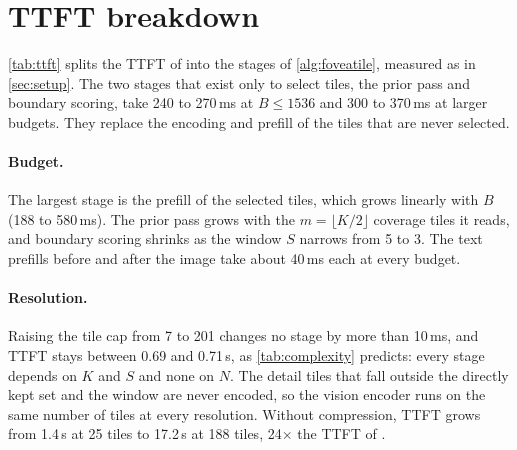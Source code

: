 \section{TTFT breakdown}
\label{sec:supp_ttft}



\cref{tab:ttft} splits the TTFT of \method into the stages of \cref{alg:foveatile}, measured as in
\cref{sec:setup}. The two stages that exist only to select tiles, the prior pass and boundary scoring, take
240 to 270\,ms at $B\le1536$ and 300 to 370\,ms at larger budgets. They replace the encoding and prefill
of the tiles that are never selected.

\paragraph{Budget.} The largest stage is the prefill of the selected tiles, which grows linearly with $B$
(188 to 580\,ms). The prior pass grows with the $m=\lfloor K/2\rfloor$ coverage tiles it reads, and boundary
scoring shrinks as the window $S$ narrows from 5 to 3. The text prefills before and after the image take
about 40\,ms each at every budget.

\paragraph{Resolution.} Raising the tile cap from 7 to 201 changes no stage by more than 10\,ms, and TTFT
stays between 0.69 and 0.71\,s, as \cref{tab:complexity} predicts: every stage depends on $K$ and $S$ and
none on $N$. The detail tiles that fall outside the directly kept set and the window are never encoded,
so the vision encoder runs on the same number of tiles at every resolution. Without compression, TTFT grows
from 1.4\,s at 25 tiles to 17.2\,s at 188 tiles, 24$\times$ the TTFT of \method.
